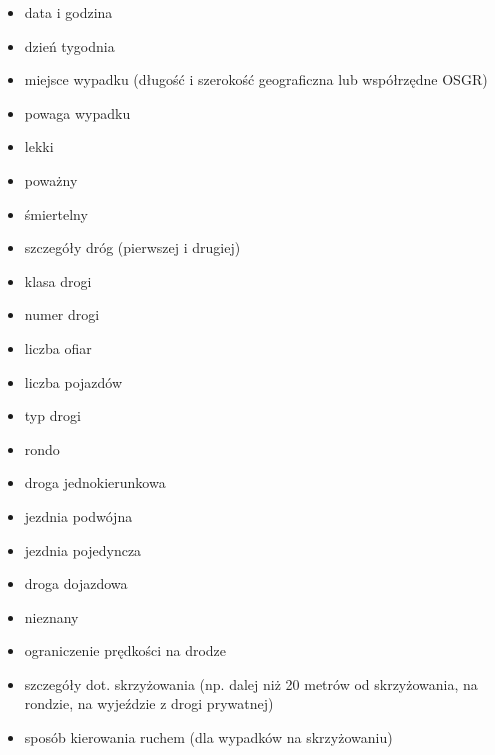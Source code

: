 \begin{itemize}
\itemsep1pt\parskip0pt
\item
  data i godzina\\
\item
  dzień tygodnia\\
\item
  miejsce wypadku (długość i szerokość geograficzna lub współrzędne
  OSGR)\\
\item
  powaga wypadku\\
\item
  lekki\\
\item
  poważny\\
\item
  śmiertelny\\
\item
  szczegóły dróg (pierwszej i drugiej)\\
\item
  klasa drogi\\
\item
  numer drogi\\
\item
  liczba ofiar\\
\item
  liczba pojazdów\\
\item
  typ drogi\\
\item
  rondo\\
\item
  droga jednokierunkowa\\
\item
  jezdnia podwójna\\
\item
  jezdnia pojedyncza\\
\item
  droga dojazdowa\\
\item
  nieznany\\
\item
  ograniczenie prędkości na drodze\\
\item
  szczegóły dot. skrzyżowania (np. dalej niż 20 metrów od skrzyżowania,
  na rondzie, na wyjeździe z drogi prywatnej)\\
\item
  sposób kierowania ruchem (dla wypadków na skrzyżowaniu)\\

\end{itemize}
